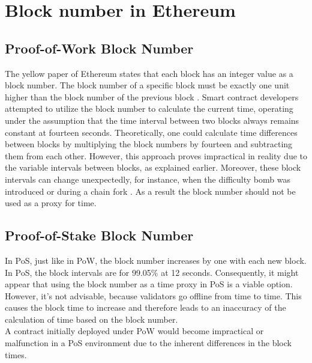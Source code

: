 \section{Block number in Ethereum}
\subsection{Proof-of-Work Block Number}
The yellow paper of Ethereum states that each block has
an integer value as a block number. The block number
of a specific block must be exactly one unit higher than the block
number of the previous block \cite{ethyellowpaper2023}.
Smart contract developers attempted to utilize the block number to calculate
the current time, operating under the assumption that the time interval between
two blocks always remains constant at fourteen seconds. Theoretically, one could
calculate time differences between blocks by multiplying the block numbers by fourteen 
and subtracting them from each other.
However, this approach proves impractical in reality due to the variable
intervals between blocks, as explained earlier. Moreover, these block intervals
can change unexpectedly, for instance, when the difficulty bomb was introduced
or during a chain fork \cite{swc116}.
As a result the block number should not be used as a proxy for time.

%

\subsection{Proof-of-Stake Block Number}
In PoS, just like in PoW, the block number increases by one with each new
block. In PoS, the block intervals are for 99.05\% at 12 seconds. Consequently,
it might appear that using the block number as a time proxy in PoS is a viable
option. However, it's not advisable, because validators go offline from time to
time. This causes the block time to increase and therefore leads to an
inaccuracy of the calculation of time based on the block number. \\
A contract initially deployed under PoW would
become impractical or malfunction in a PoS environment due to the inherent differences in the block times.

